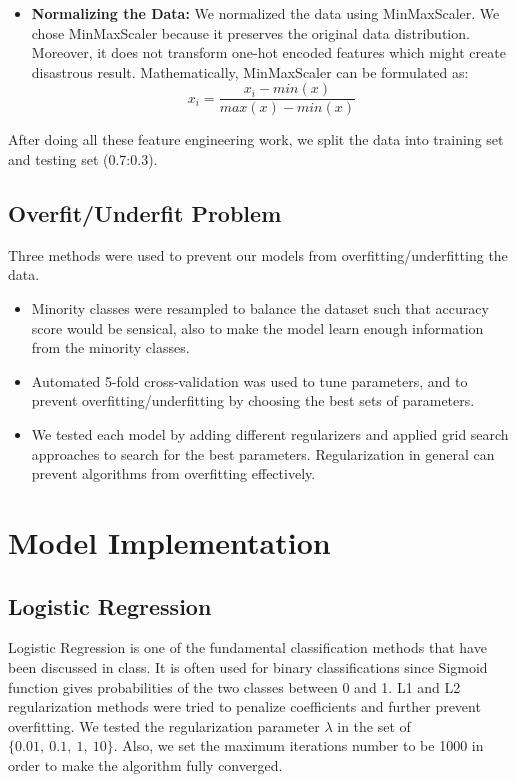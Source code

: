 \documentclass[letterpaper, 10 pt, conference]{ieeeconf}  %
\begin{document}
\begin{itemize}
    \item \textbf{Normalizing the Data:} We normalized the data using MinMaxScaler. We chose MinMaxScaler because it preserves the original data distribution. Moreover, it does not transform one-hot encoded features which might create disastrous result. Mathematically, MinMaxScaler can be formulated as:
    \begin{equation}
        x_i = \frac{x_i-min(x)}{max(x)-min(x)}
    \end{equation}
    
\end{itemize}
After doing all these feature engineering work, we split the data into training set and testing set (0.7:0.3).

\subsection{Overfit/Underfit Problem}
Three methods were used to prevent our models from overfitting/underfitting the data.

\begin{itemize}
\item Minority classes were resampled to balance the dataset such that accuracy score would be sensical, also to make the model learn enough information from the minority classes.
\item Automated 5-fold cross-validation was used to tune parameters, and to prevent overfitting/underfitting by choosing the best sets of parameters.
\item We tested each model by adding different regularizers and applied grid search approaches to search for the best parameters. Regularization in general can prevent algorithms from overfitting effectively.
\end{itemize}


\section{Model Implementation}

\subsection{Logistic Regression}
Logistic Regression is one of the fundamental classification methods that have been discussed in class. It is often used for binary classifications since Sigmoid function gives probabilities of the two classes between 0 and 1. L1 and L2 regularization methods were tried to penalize coefficients and further prevent overfitting. We tested the regularization parameter $\lambda$ in the set of $\{0.01,\ 0.1,\ 1,\ 10\}$. Also, we set the maximum iterations number to be 1000 in order to make the algorithm fully converged.
\end{document}
